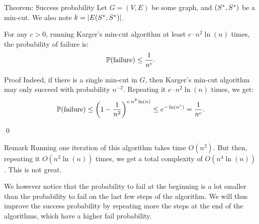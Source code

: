 \documentclass[a4paper]{article}
\begin{document}
\begin{parag}{Theorem: Success probability}
    Let $G = \left(V, E\right)$ be some graph, and $\left(S^*, \smash{\bar{S}}^*\right)$ be a min-cut. We also note $k = \left|E\left(S^*, \smash{\bar{S}}^*\right)\right|$.

    For any $c > 0$, running Karger's min-cut algorithm at least $c\cdot n^2 \ln\left(n\right)$ times, the probability of failure is: 
    \[\prob\left(\text{failure}\right) \leq \frac{1}{n^c}.\]

    \begin{subparag}{Proof}
        Indeed, if there is a single min-cut in $G$, then Karger's min-cut algorithm may only succeed with probability $n^{-2}$. Repeating it $c\cdot n^2 \ln\left(n\right)$ times, we get: 
        \[\prob\left(\text{failure}\right) \leq \left(1 - \frac{1}{n^2}\right)^{c\cdot n^2 \ln\left(n\right)} \leq e^{-\ln\left(n^c\right)} = \frac{1}{n^c}.\]

        \qed
    \end{subparag}

    \begin{subparag}{Remark}
        Running one iteration of this algorithm takes time $O\left(n^2\right)$. But then, repeating it $O\left(n^2 \ln\left(n\right)\right)$ times, we get a total complexity of $O\left(n^4 \ln\left(n\right)\right)$. This is not great.

        We however notice that the probability to fail at the beginning is a lot smaller than the probability to fail on the last few steps of the algorithm. We will thus improve the success probability by repeating more the steps at the end of the algorithms, which have a higher fail probability.
    \end{subparag}
\end{parag}
\end{document}
